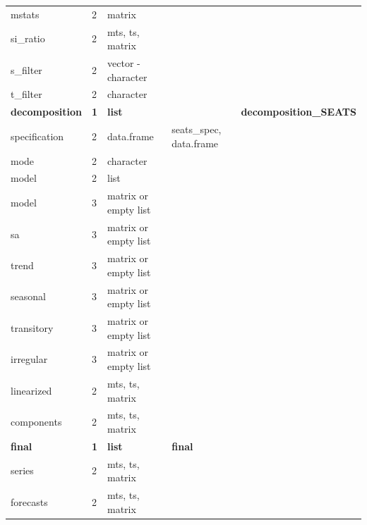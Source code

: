 \documentclass[article]{jss}
\begin{document}
\begin{longtable}[t]{lllll}
\addlinespace
\hspace{2em}mstats & 2 & matrix &  & \\
\hspace{2em}si\_ratio & 2 & mts, ts, matrix &  & \\
\hspace{2em}s\_filter & 2 & vector - character &  & \\
\hspace{2em}t\_filter & 2 & character &  & \\
\textbf{\hspace{1em}decomposition} & \textbf{1} & \textbf{list} & \textbf{} & \textbf{decomposition\_SEATS}\\
\addlinespace
\hspace{2em}specification & 2 & data.frame & seats\_spec, data.frame & \\
\hspace{2em}mode & 2 & character &  & \\
\hspace{2em}model & 2 & list &  & \\
\hspace{3em}model & 3 & matrix or empty list &  & \\
\hspace{3em}sa & 3 & matrix or empty list &  & \\
\addlinespace
\hspace{3em}trend & 3 & matrix or empty list &  & \\
\hspace{3em}seasonal & 3 & matrix or empty list &  & \\
\hspace{3em}transitory & 3 & matrix or empty list &  & \\
\hspace{3em}irregular & 3 & matrix or empty list &  & \\
\hspace{2em}linearized & 2 & mts, ts, matrix &  & \\
\addlinespace
\hspace{2em}components & 2 & mts, ts, matrix &  & \\
\textbf{\hspace{1em}final} & \textbf{1} & \textbf{list} & \textbf{final}\\
\hspace{2em}series & 2 & mts, ts, matrix &  & \\
\hspace{2em}forecasts & 2 & mts, ts, matrix &  & \\

\end{longtable}
\end{document}
